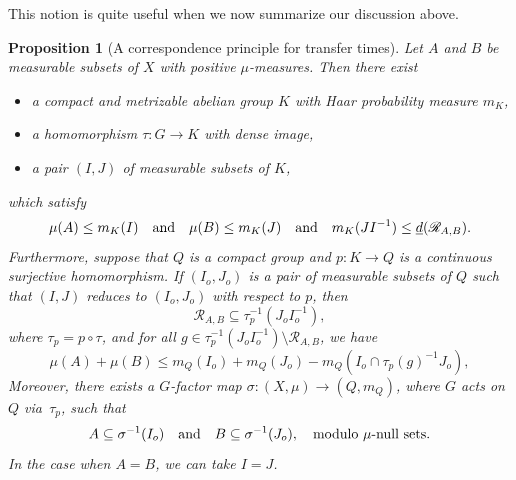 \documentclass[JEP,XML,SOM,Unicode]{cedram}
\let\mathcal\mathscr
\newcommand{\cR}{\mathcal{R}}
\newcommand{\qand}{\quad\textup{and}\quad}
\theoremstyle{plain}
\newtheorem{proposition}[theorem]{Proposition}
\theoremstyle{definition}
\begin{document}
This notion is quite useful when we now summarize our discussion above.

\begin{proposition}[A correspondence principle for transfer times]
\label{mainprop}
Let $A$ and $B$ be measurable subsets of $X$ with positive $\mu$-measures. Then there exist

\begin{itemize}
\item a compact and metrizable abelian group $K$ with Haar probability measure $m_K$,
\item a homomorphism $\tau : G \to K$ with dense image,
\item a pair $(I,J)$ of measurable subsets of $K$,
\end{itemize}

which satisfy
\[
\mu(A) \leq m_K(I) \qand \mu(B) \leq m_K(J) \qand m_K(JI^{-1}) \leq \underline{d}(\cR_{A,B}).
\]
Furthermore, suppose that $Q$ is a compact group and $p : K \to Q$ is a continuous surjective homomorphism.
If $(I_o,J_o)$ is a pair of measurable subsets of $Q$ such that $(I,J)$ reduces to $(I_o,J_o)$ with respect to $p$,
then
\[
\cR_{A,B} \subseteq \tau_p^{-1}(J_o I_o^{-1}),
\]
where $\tau_p = p \circ \tau$, and for all $g \in \tau_p^{-1}(J_oI_o^{-1}) \setminus \cR_{A,B}$, we have
\[
\mu(A) + \mu(B) \leq m_Q(I_o) + m_Q(J_o) - m_Q(I_o \cap \tau_p(g)^{-1}J_o),
\]
Moreover, there exists a $G$-factor map $\sigma : (X,\mu) \to (Q,m_Q)$, where $G$ acts on $Q$ via~$\tau_p$, such that
\[
A \subseteq \sigma^{-1}(I_o) \qand B \subseteq \sigma^{-1}(J_o), \quad \textrm{modulo $\mu$-null sets}.
\]
In the case when $A = B$, we can take $I = J$.
\end{proposition}
\end{document}
